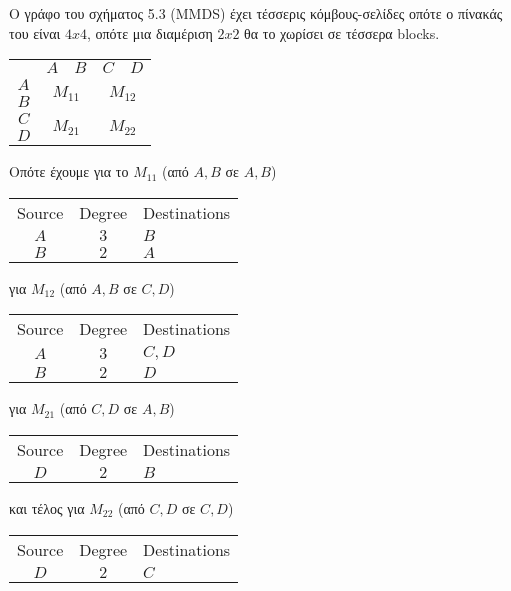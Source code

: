 \documentclass[a4paper,11pt]{article}
\begin{document}
Ο γράφο του σχήματος 5.3 (MMDS) έχει τέσσερις κόμβους-σελίδες οπότε ο πίνακάς του είναι $4x4$, οπότε μια διαμέριση $2x2$ θα το χωρίσει σε τέσσερα blocks.
\begin{center}
	\begin{tabular}{| c | c | c |}
		\hline
		& $A \quad B$ & $C \quad D$ \\ \hhline{|=|=|=|}
		$A$ & \multirow{2}{*}{$M_{11}$} & \multirow{2}{*}{$M_{12}$} \\
		$B$ & & \\
		\hline
		$C$ & \multirow{2}{*}{$M_{21}$} & \multirow{2}{*}{$M_{22}$} \\
		$D$ & & \\
		\hline
	\end{tabular}
\end{center}
Οπότε έχουμε για το $M_{11}$ (από $A,B$ σε $A,B$)
\begin{center}
	\begin{tabular}{| c | c | l |}
		\hline
		Source & Degree & Destinations \\ \hhline{|=|=|=|}
		$A$ & $3$ & $B$ \\
		$B$ & $2$ & $A$ \\
		\hline
	\end{tabular}
\end{center}
για $M_{12}$ (από $A,B$ σε $C,D$)
\begin{center}
	\begin{tabular}{| c | c | l |}
		\hline
		Source & Degree & Destinations \\ \hhline{|=|=|=|}
		$A$ & $3$ & $C,D$ \\
		$B$ & $2$ & $D$ \\
		\hline
	\end{tabular}
\end{center}
για $M_{21}$ (από $C,D$ σε $A,B$)
\begin{center}
	\begin{tabular}{| c | c | l |}
		\hline
		Source & Degree & Destinations \\ \hhline{|=|=|=|}
		$D$ & $2$ & $B$ \\
		\hline
	\end{tabular}
\end{center}
και τέλος για $M_{22}$ (από $C,D$ σε $C,D$)
\begin{center}
	\begin{tabular}{| c | c | l |}
		\hline
		Source & Degree & Destinations \\ \hhline{|=|=|=|}
		$D$ & $2$ & $C$ \\
		\hline
	\end{tabular}
\end{center}
\end{document}
